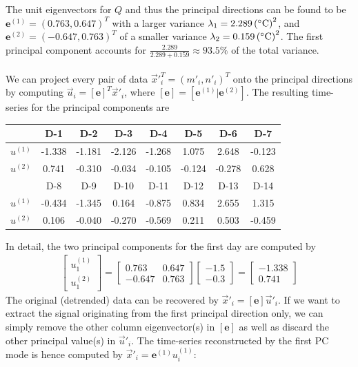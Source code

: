 \begin{solution}
The unit eigenvectors for $Q$ and thus the principal directions can be found to be $\textbf{e}^{(1)} = (0.763, 0.647)^T$ with a larger variance $\lambda_1 = \SI{2.289}{\square {(\degree C)}}$, and $\textbf{e}^{(2)} = (-0.647, 0.763)^T$ of a smaller variance $\lambda_2 = \SI{0.159}{\square {(\degree C)}}$. The first principal component accounts for $\frac{2.289}{2.289+0.159} \approx 93.5\%$ of the total variance.\\
\\
We can project every pair of data $\vec{x}'^T_i = (m'_i, n'_i)^T$ onto the principal directions by computing $\vec{u}_i = [\textbf{e}]^T\vec{x}'_i$, where $[\textbf{e}] = [\textbf{e}^{(1)}|\textbf{e}^{(2)}]$. The resulting time-series for the principal components are 
\begin{center}
\begin{tabular}{|c|c|c|c|c|c|c|c|}
\hline
 & D-1 & D-2 & D-3 & D-4 & D-5 & D-6 & D-7 \\
\hline
$u^{(1)}$ & -1.338 & -1.181 & -2.126 & -1.268 & 1.075 & 2.648 & -0.123 \\
\hline
$u^{(2)}$ & 0.741 & -0.310 & -0.034 & -0.105 & -0.124 & -0.278 & 0.628 \\
\hline
 & D-8 & D-9 & D-10 & D-11 & D-12 & D-13 & D-14 \\
\hline
$u^{(1)}$ & -0.434 & -1.345 & 0.164 & -0.875 & 0.834 & 2.655 & 1.315 \\
\hline
$u^{(2)}$ & 0.106 & -0.040 & -0.270 & -0.569 & 0.211 & 0.503 & -0.459 \\
\hline
\end{tabular}
\end{center}
In detail, the two principal components for the first day are computed by
\begin{align*}
\begin{bmatrix}
u_1^{(1)} \\
u_1^{(2)} 
\end{bmatrix}
=
\begin{bmatrix}
0.763 & 0.647 \\
-0.647 & 0.763
\end{bmatrix}
\begin{bmatrix}
-1.5 \\
-0.3
\end{bmatrix}
=
\begin{bmatrix}
-1.338\\
0.741
\end{bmatrix}
\end{align*}
The original (detrended) data can be recovered by $\vec{x}'_i = [\textbf{e}]\vec{u}'_i$. If we want to extract the signal originating from the first principal direction only, we can simply remove the other column eigenvector(s) in $[\textbf{e}]$ as well as discard the other principal value(s) in $\vec{u}'_i$. The time-series reconstructed by the first PC mode is hence computed by $\vec{x}'_i = \textbf{e}^{(1)}u_i^{(1)}$:

\end{solution}
